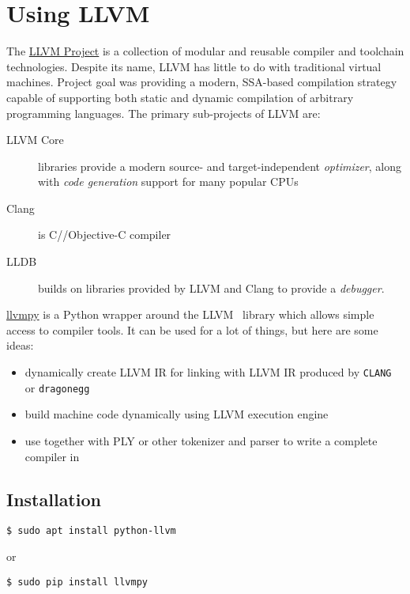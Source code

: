 \chapter{Using LLVM}\clearpage

The \href{http://llvm.org/}{LLVM Project} is a
collection of modular and reusable compiler and toolchain technologies. Despite
its name, LLVM has little to do with traditional virtual machines. Project goal
was providing a modern, SSA-based
compilation strategy capable of supporting both static and dynamic compilation
of arbitrary programming languages. The primary sub-projects of LLVM are:
\begin{description}
\item[LLVM Core] libraries provide a modern source- and target-independent
\emph{optimizer}, along with \emph{code generation} support for many popular
CPUs
\item[Clang] is C/\cpp/Objective-C compiler
\item[LLDB] builds on libraries provided by LLVM and Clang to provide a \emph{debugger}.
\end{description}

\bigskip
\href{http://www.llvmpy.org/}{llvmpy} is a Python wrapper around the LLVM \cpp\
library which allows simple access to compiler tools.
It can be used for a lot of things, but here are some ideas:
\begin{itemize}[nosep]
  \item 
dynamically create LLVM IR for linking with LLVM IR produced by \verb|CLANG| or
\verb|dragonegg|
  \item 
build machine code dynamically using LLVM execution engine
  \item 
use together with PLY or other tokenizer and parser to write a complete compiler
in \py
\end{itemize}

\section{Installation}

\begin{verbatim}
$ sudo apt install python-llvm
\end{verbatim}
or
\begin{verbatim}
$ sudo pip install llvmpy
\end{verbatim}

